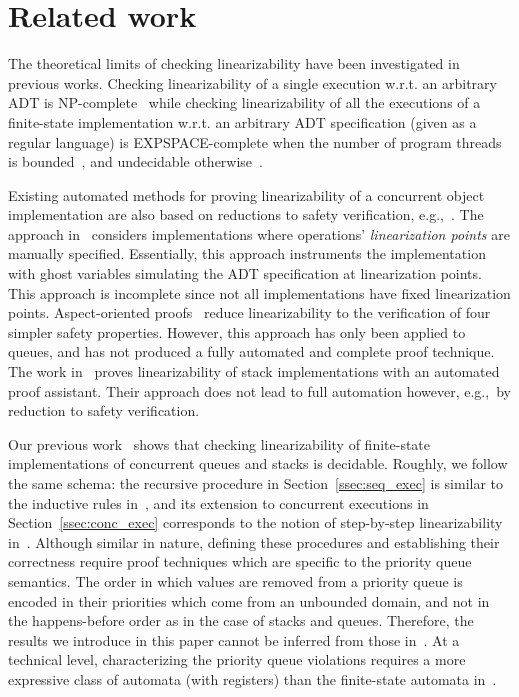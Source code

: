 \section{Related work}\label{sec:related}

The theoretical limits of checking linearizability have been investigated in previous works. 
Checking linearizability of a single execution w.r.t. an arbitrary ADT is NP-complete~\cite{journals/siamcomp/GibbonsK97} while checking linearizability of all the executions  
of a finite-state implementation w.r.t. an arbitrary ADT 
specification (given as a regular language) is EXPSPACE-complete when the number of program 
threads is bounded~\cite{journals/iandc/AlurMP00,netys-lin}, and
undecidable otherwise~\cite{conf/esop/BouajjaniEEH13}. 

Existing automated methods for proving linearizability of a concurrent object
implementation are also based on reductions to safety
verification, e.g.,~\cite{conf/tacas/AbdullaHHJR13, conf/concur/HenzingerSV13,
conf/cav/Vafeiadis10}. The approach in~\cite{conf/cav/Vafeiadis10} considers
implementations where 
operations' \emph{linearization points}
are 
manually specified.
Essentially, this approach instruments the
implementation with ghost variables simulating the ADT specification at
linearization points. This approach is incomplete since not all implementations
have fixed linearization points. Aspect-oriented
proofs~\cite{conf/concur/HenzingerSV13} reduce linearizability to the
verification of four simpler safety properties. However, this approach has only
been applied to queues, and has not produced a fully automated
and complete proof technique. The work in~\cite{Dodds:2015:SCT:2676726.2676963} proves 
linearizability of stack implementations with an automated proof assistant. 
Their approach does not lead to full automation however, e.g.,~by reduction to 
safety verification.

Our previous work~\cite{DBLP:conf/icalp/BouajjaniEEH15}
shows that checking linearizability of finite-state implementations of concurrent queues and stacks is decidable.
Roughly, we follow the same schema: the recursive procedure in Section~\ref{ssec:seq_exec} is similar to the inductive rules in~\cite{DBLP:conf/icalp/BouajjaniEEH15}, and its extension to concurrent executions in Section~\ref{ssec:conc_exec} corresponds to the notion of step-by-step linearizability in~\cite{DBLP:conf/icalp/BouajjaniEEH15}. Although similar in nature, defining these procedures and establishing their correctness require proof techniques which are specific to the priority queue semantics. The order in which values are removed from a priority queue is encoded in their priorities which come from an unbounded domain, and not in the happens-before order as in the case of stacks and queues. Therefore, the results we introduce in this paper cannot be inferred from those in~\cite{DBLP:conf/icalp/BouajjaniEEH15}. At a technical level, characterizing the priority queue violations requires a more expressive class of automata (with registers) than the finite-state automata in~\cite{DBLP:conf/icalp/BouajjaniEEH15}.

